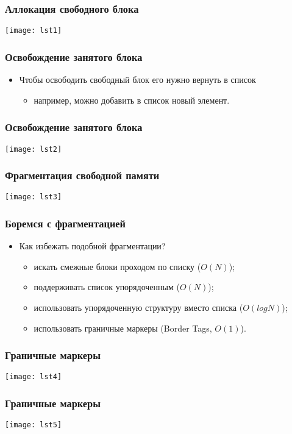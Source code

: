 \begin{frame}
\frametitle{Аллокация свободного блока}
\texttt{[image: lst1]}
\end{frame}

\begin{frame}
\frametitle{Освобождение занятого блока}
\begin{itemize}
    \item<1->Чтобы освободить свободный блок его нужно вернуть в список
    \begin{itemize}
        \item<2->например, можно добавить в список новый элемент.
    \end{itemize}
\end{itemize}
\end{frame}

\begin{frame}
\frametitle{Освобождение занятого блока}
\texttt{[image: lst2]}
\end{frame}

\begin{frame}
\frametitle{Фрагментация свободной памяти}
\texttt{[image: lst3]}
\end{frame}

\begin{frame}
\frametitle{Боремся с фрагментацией}
\begin{itemize}
    \item<1->Как избежать подобной фрагментации?
    \begin{itemize}
        \item<2->искать смежные блоки проходом по списку ($O\left(N\right)$);
        \item<3->поддерживать список упорядоченным ($O\left(N\right)$);
        \item<4->использовать упорядоченную структуру вместо списка
        ($O\left(log N\right)$);
        \item<5->использовать граничные маркеры (Border Tags,
        $O\left(1\right)$).
    \end{itemize}
\end{itemize}
\end{frame}

\begin{frame}
\frametitle{Граничные маркеры}
\texttt{[image: lst4]}
\end{frame}

\begin{frame}
\frametitle{Граничные маркеры}
\texttt{[image: lst5]}
\end{frame}

